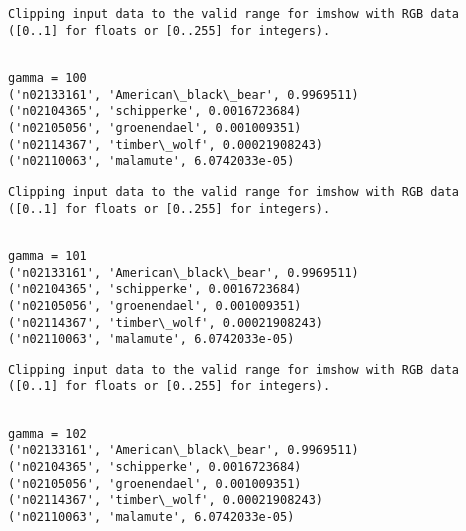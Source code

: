 \documentclass[11pt]{article}
\begin{document}
    \begin{Verbatim}[commandchars=\\\{\}]
Clipping input data to the valid range for imshow with RGB data ([0..1] for floats or [0..255] for integers).

    \end{Verbatim}

    \begin{Verbatim}[commandchars=\\\{\}]

gamma = 100
('n02133161', 'American\_black\_bear', 0.9969511)
('n02104365', 'schipperke', 0.0016723684)
('n02105056', 'groenendael', 0.001009351)
('n02114367', 'timber\_wolf', 0.00021908243)
('n02110063', 'malamute', 6.0742033e-05)

    \end{Verbatim}

    \begin{Verbatim}[commandchars=\\\{\}]
Clipping input data to the valid range for imshow with RGB data ([0..1] for floats or [0..255] for integers).

    \end{Verbatim}

    \begin{Verbatim}[commandchars=\\\{\}]

gamma = 101
('n02133161', 'American\_black\_bear', 0.9969511)
('n02104365', 'schipperke', 0.0016723684)
('n02105056', 'groenendael', 0.001009351)
('n02114367', 'timber\_wolf', 0.00021908243)
('n02110063', 'malamute', 6.0742033e-05)

    \end{Verbatim}

    \begin{Verbatim}[commandchars=\\\{\}]
Clipping input data to the valid range for imshow with RGB data ([0..1] for floats or [0..255] for integers).

    \end{Verbatim}

    \begin{Verbatim}[commandchars=\\\{\}]

gamma = 102
('n02133161', 'American\_black\_bear', 0.9969511)
('n02104365', 'schipperke', 0.0016723684)
('n02105056', 'groenendael', 0.001009351)
('n02114367', 'timber\_wolf', 0.00021908243)
('n02110063', 'malamute', 6.0742033e-05)

    \end{Verbatim}
\end{document}

